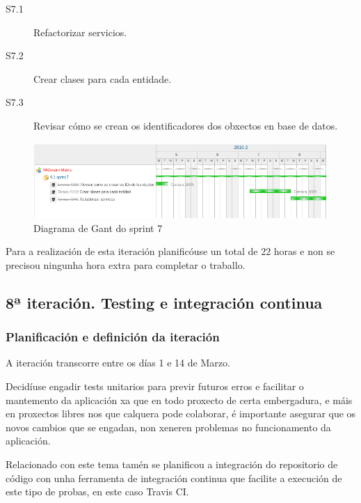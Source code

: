         \begin{description}
         \item [S7.1] Refactorizar servicios.
         \item [S7.2] Crear clases para cada entidade.
         \item [S7.3] Revisar cómo se crean os identificadores dos obxectos en 
base de datos.
        \end{description}

        \begin{figure}[h!]
          \begin{center}
          \includegraphics[width=\textwidth]{./img/gant_diagrams/07.png}
          \caption{Diagrama de Gant do sprint 7}
          \label{fig:gant07}
          \end{center}
        \end{figure}

    Para a realización de esta iteración planificóuse un total de 22 horas e 
non se precisou ningunha hora extra para completar o traballo.

    \subsection{8ª iteración. Testing e integración continua}

      \subsubsection{Planificación e definición da iteración}
      A iteración transcorre entre os días 1 e 14 de Marzo.

      Decidíuse engadir tests unitarios para previr futuros erros e facilitar o 
mantemento da aplicación xa que en todo proxecto de certa embergadura, e máis 
en proxectos libres nos que calquera pode colaborar, é importante asegurar que 
os novos cambios que se engadan, non xeneren problemas no funcionamento da 
aplicación.

      Relacionado con este tema tamén se planificou a integración do 
repositorio de código con unha ferramenta de integración continua que facilite 
a execución de este tipo de probas, en este caso Travis CI.

